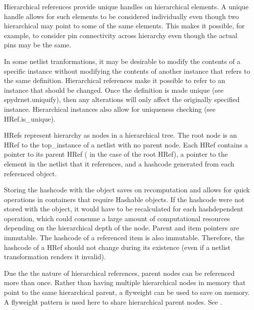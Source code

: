 \documentclass[letterpaper,10pt,english,openany,oneside]{sphinxmanual}
\begin{document}
\begin{fulllineitems}
\begin{itemize}
\begin{description}
\begin{itemize}
\end{itemize}

\end{description}

\end{itemize}


Hierarchical references provide unique handles on hierarchical elements. A unique handle allows for such elements to
be considered individually even though two hierarchical may point to some of the same elements. This makes it
possible, for example, to consider pin connectivity across hierarchy even though the actual pins may be the same.

In some netlist tranformations, it may be desirable to modify the contents of a specific instance without modifying
the contents of another instance that refers to the same definition. Hierarchical references make it possible to
refer to an instance that should be changed. Once the definition is made unique (see spydrnet.uniquify), then any
alterations will only affect the originally specified instance. Hierarchical instances also allow for uniqueness
checking (see HRef.is\_unique).


HRefs represent hierarchy as nodes in a hierarchical tree. The root node is an HRef to the top\_instance of a netlist
with no parent node. Each HRef contains a pointer to its parent HRef ( in the case of the root HRef), a
pointer to the element in the netlist that it references, and a hashcode generated from each referenced object.

Storing the hashcode with the object saves on re\sphinxhyphen{}computation and allows for quick operations in containers that
require Hashable objects. If the hashcode were not stored with the object, it would have to be recalculated for
each hash\sphinxhyphen{}dependent operation, which could consume a large amount of computational resources depending on the
hierarchical depth of the node. Parent and item pointers are immutable. The hashcode of a referenced item is also
immutable. Therefore, the hashcode of a HRef should not change during its existence (even if a netlist
transformation renders it invalid).


Due the the nature of hierarchical references, parent nodes can be referenced more than once. Rather than having
multiple hierarchical nodes in memory that point to the same hierarchical parent, a flyweight can be used to save
on memory. A flyweight pattern is used here to share hierarchical parent nodes. See .


\end{fulllineitems}
\end{document}
